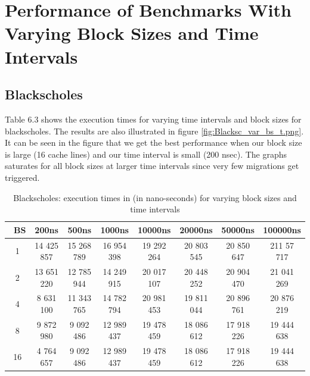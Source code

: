 \documentclass{listhesis}
\begin{document}
\section{Performance of Benchmarks With Varying Block Sizes and Time Intervals}
\subsection{Blackscholes}
Table 6.3 shows the execution times for varying time intervals and block sizes for blackscholes. The results are also illustrated in figure \ref{fig:Blacksc_var_bs_t.png}. It can be seen in the figure that we get the best performance when our block size is large (16 cache lines) and our time interval is small (200 nsec). The graphs saturates for all block sizes at larger time intervals since very few migrations get triggered. 

\begin{table}[h!]
\begin{center}
 \begin{tabular}{|| c | c | c | c| c | c | c | c||} 
 \hline
 \ \textbf{BS} & \textbf{200ns}  & \textbf{500ns}  & \textbf{1000ns} & \textbf{10000ns} & \textbf{20000ns} & \textbf{50000ns} & \textbf{100000ns}\\ [0.5 ex] 
 \hline\hline
   1 & 14 425 857  & 15 268 789 &  16 954 398 & 19 292 264 & 20 803 545 & 20 850 647 &  211 57 717\\ 
 \hline
   2 & 13 651 220 & 12 785 944 & 14 249 915 & 20 017 107 & 20 448 252 & 20 904 470 & 21 041 269\\
 \hline
   4 & 8 631 100 & 11 343 765 & 14 782 794 & 20 981 453 & 19 811 044 & 20 896 761 & 20 876 219\\
 \hline
   8 & 9 872 980 & 9 092 486 & 12 989 437 & 19 478 459 & 18 086 612 & 17 918 226 & 19 444 638\\
  \hline
   16 & 4 764 657 & 9 092 486 & 12 989 437 & 19 478 459 & 18 086 612 & 17 918 226 & 19 444 638\\
    \hline
\end{tabular}
 \caption{Blackscholes: execution times in (in nano-seconds) for varying block sizes and time intervals}
 \label{table:ExecTimes2}
\end{center}
\end{table}
\end{document}
